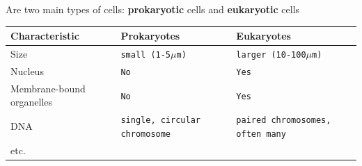 \documentclass[10pt]{beamer}
\begin{document}
\begin{frame}[t]

	\begin{center}
		\textcolor{myblue}{Are two main types of cells: \textbf{prokaryotic} cells and \textbf{eukaryotic} cells}\\
		
		\vspace{1.0cm}
		
		\begin{tabular}{p{3.0cm} p{3.0cm} p{3.5cm}}
			\textbf{Characteristic} & \textbf{Prokaryotes} & \textbf{Eukaryotes}\\
			\midrule
			Size & \texttt{small (1-5$\mu$m)} & \texttt{larger (10-100$\mu$m)}\\
			\addlinespace
			\addlinespace
			Nucleus & \texttt{No} & \texttt{Yes}\\
			\addlinespace
			\addlinespace
			Membrane-bound organelles & \texttt{No} & \texttt{Yes}\\
			\addlinespace
			\addlinespace
			DNA & \texttt{single, circular chromosome} & \texttt{paired chromosomes, often many}\\
			\addlinespace
			\addlinespace
			etc. & &\\
		\end{tabular}
	\end{center}
\end{frame}
\end{document}
